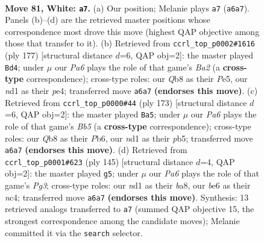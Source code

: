\documentclass[11pt]{article}
\begin{document}
\clearpage

\begin{figure}[p]\centering
\begin{subfigure}{0.46\textwidth}\centering
\resizebox{\linewidth}{!}{%
\newchessgame
\chessboard[
  setfen={1Q6/6k1/P3b3/6K1/8/8/8/3n4 w - - 3 81},
  showmover=false,
  pgfstyle=straightmove, color=movearrow, markmove={a6-a7}
]}
\caption{}
\end{subfigure}\hfill
\begin{subfigure}{0.46\textwidth}\centering
\resizebox{\linewidth}{!}{%
\newchessgame
\chessboard[
  setfen={8/b7/8/4p3/B1K1P3/8/3k4/8 b - - 1 89},
  showmover=false,
  pgfstyle=straightmove, color=movearrow, markmove={a7-d4}
]}
\caption{}
\end{subfigure}
\\[4pt]
\begin{subfigure}{0.46\textwidth}\centering
\resizebox{\linewidth}{!}{%
\newchessgame
\chessboard[
  setfen={8/8/1p3k2/1P1K4/1b6/8/8/1B6 b - - 14 87},
  showmover=false,
  pgfstyle=straightmove, color=movearrow, markmove={b4-a5}
]}
\caption{}
\end{subfigure}\hfill
\begin{subfigure}{0.46\textwidth}\centering
\resizebox{\linewidth}{!}{%
\newchessgame
\chessboard[
  setfen={B7/8/6p1/8/2N2k2/8/4K3/b7 b - - 25 73},
  showmover=false,
  pgfstyle=straightmove, color=movearrow, markmove={g6-g5}
]}
\caption{}
\end{subfigure}
\caption{\textbf{Move 81, White: \texttt{a7}.} (a) Our position; Melanie plays \texttt{a7} (\texttt{a6a7}). Panels (b)--(d) are the retrieved master positions whose correspondence most drove this move (highest QAP objective among those that transfer to it). (b) Retrieved from \texttt{ccrl\_top\_p0002\#1616} (ply 177) [structural distance $d$=6, QAP obj=2]: the master played \texttt{Bd4}; under $\mu$ our \emph{Pa6} plays the role of that game's \emph{Ba2} (a \textbf{cross-type} correspondence); cross-type roles: our \emph{Q}b8 as their \emph{P}e5, our \emph{n}d1 as their \emph{p}e4; transferred move \texttt{a6a7} \textbf{(endorses this move)}. (c) Retrieved from \texttt{ccrl\_top\_p0000\#44} (ply 173) [structural distance $d$=6, QAP obj=2]: the master played \texttt{Ba5}; under $\mu$ our \emph{Pa6} plays the role of that game's \emph{Bb5} (a \textbf{cross-type} correspondence); cross-type roles: our \emph{Q}b8 as their \emph{P}b6, our \emph{n}d1 as their \emph{p}b5; transferred move \texttt{a6a7} \textbf{(endorses this move)}. (d) Retrieved from \texttt{ccrl\_top\_p0001\#623} (ply 145) [structural distance $d$=4, QAP obj=2]: the master played \texttt{g5}; under $\mu$ our \emph{Pa6} plays the role of that game's \emph{Pg3}; cross-type roles: our \emph{n}d1 as their \emph{b}a8, our \emph{b}e6 as their \emph{n}c4; transferred move \texttt{a6a7} \textbf{(endorses this move)}. Synthesis: 13 retrieved analogs transferred to \texttt{a7} (summed QAP objective 15, the strongest correspondence among the candidate moves); Melanie committed it via the \texttt{search} selector.}
\label{fig:thought-m160}
\end{figure}
\end{document}
